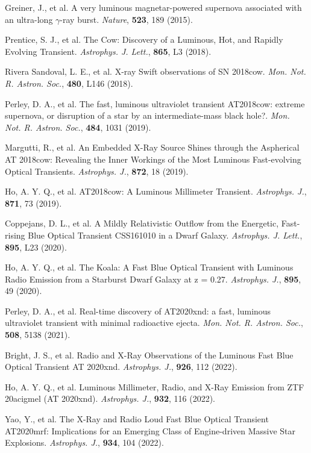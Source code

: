 \documentclass{nature_plusfigure}
\newcommand{\mn}{{Mon. Not. R. Astron. Soc.}}
\newcommand{\mnras}{\mn}
\newcommand{\apj}{{Astrophys. J.}}
\newcommand{\apjl}{{Astrophys. J. Lett.}}
\newcommand{\nat}{{Nature}}
\begin{document}
\begin{thebibliography}{100}

 Greiner, J., et al. A very luminous magnetar-powered supernova associated with an ultra-long $\gamma$-ray burst. \emph{\nat}, \textbf{523}, 189 (2015). 

 Prentice, S. J., et al. The Cow: Discovery of a Luminous, Hot, and Rapidly Evolving Transient. \emph{\apjl}, \textbf{865}, L3 (2018). 

  Rivera Sandoval, L. E., et al. X-ray Swift observations of SN 2018cow. \emph{\mnras}, \textbf{480}, L146 (2018). 

 Perley, D. A., et al. The fast, luminous ultraviolet transient AT2018cow: extreme supernova, or disruption of a star by an intermediate-mass black hole?. \emph{\mnras}, \textbf{484}, 1031 (2019). 

 Margutti, R., et al. An Embedded X-Ray Source Shines through the Aspherical AT 2018cow: Revealing the Inner Workings of the Most Luminous Fast-evolving Optical Transients. \emph{\apj}, \textbf{872}, 18 (2019). 

 Ho, A. Y. Q., et al. AT2018cow: A Luminous Millimeter Transient. \emph{\apj}, \textbf{871}, 73 (2019). 


 Coppejans, D. L., et al. A Mildly Relativistic Outflow from the Energetic, Fast-rising Blue Optical Transient CSS161010 in a Dwarf Galaxy. \emph{\apjl}, \textbf{895}, L23 (2020). 

 Ho, A. Y. Q., et al. The Koala: A Fast Blue Optical Transient with Luminous Radio Emission from a Starburst Dwarf Galaxy at z = 0.27. \emph{\apj}, \textbf{895}, 49 (2020). 

 Perley, D. A., et al. Real-time discovery of AT2020xnd: a fast, luminous ultraviolet transient with minimal radioactive ejecta. \emph{\mnras}, \textbf{508}, 5138 (2021). 

  Bright, J. S., et al. Radio and X-Ray Observations of the Luminous Fast Blue Optical Transient AT 2020xnd. \emph{\apj}, \textbf{926}, 112 (2022). 

 Ho, A. Y. Q., et al. Luminous Millimeter, Radio, and X-Ray Emission from ZTF 20acigmel (AT 2020xnd). \emph{\apj}, \textbf{932}, 116 (2022). 

 Yao, Y., et al. The X-Ray and Radio Loud Fast Blue Optical Transient AT2020mrf: Implications for an Emerging Class of Engine-driven Massive Star Explosions. \emph{\apj}, \textbf{934}, 104 (2022). 


\end{thebibliography}
\end{document}
